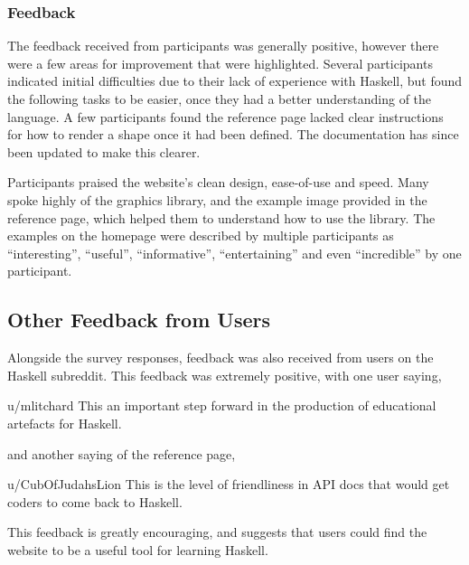 \documentclass[../main.tex]{subfiles}
\begin{document}
            \subsubsection{Feedback}
                The feedback received from participants was generally positive, however there
                    were a few areas for improvement that were highlighted.
                Several participants indicated initial difficulties due to their lack of
                    experience with Haskell, but found the following tasks to be easier, once they
                    had a better understanding of the language.
                A few participants found the reference page lacked clear instructions for how
                    to render a shape once it had been defined.
                The documentation has since been updated to make this clearer.

                Participants praised the website's clean design, ease-of-use and speed.
                Many spoke highly of the graphics library, and the example image provided in
                    the reference page, which helped them to understand how to use the library.
                The examples on the homepage were described by multiple participants as
                    ``interesting'', ``useful'', ``informative'', ``entertaining'' and even
                    ``incredible'' by one participant.

        \subsection{Other Feedback from Users}

            Alongside the survey responses, feedback was also received from users on the
                Haskell subreddit.
            This feedback was extremely positive, with one user saying,
            \begin{aquote}{u/mlitchard}
                This an important step forward in the production of educational artefacts for
                    Haskell.
            \end{aquote}
            and another saying of the reference page,
            \begin{aquote}{u/CubOfJudahsLion}
                This is the level of friendliness in API docs that would get coders to come
                    back to Haskell.
            \end{aquote}
            This feedback is greatly encouraging, and suggests that users could find the
                website to be a useful tool for learning Haskell.
\end{document}
